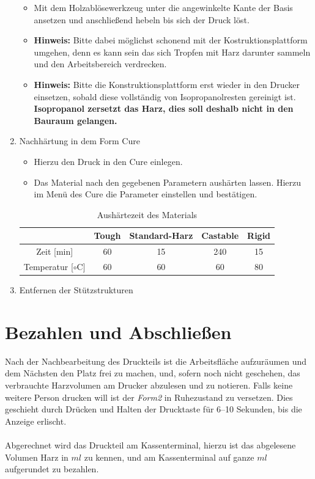\documentclass{\basedir/fablab-document}
\begin{document}
\begin{enumerate}
\begin{itemize}
            \item Mit dem Holzablösewerkzeug unter die angewinkelte Kante der Basis ansetzen und anschließend hebeln bis sich der Druck löst.
            \item \textbf{Hinweis:} Bitte dabei möglichst schonend mit der Kostruktionsplattform umgehen, denn es kann sein das sich Tropfen mit Harz darunter sammeln und den Arbeitsbereich verdrecken.
            \item \textbf{Hinweis:} Bitte die Konstruktionsplattform erst wieder in den Drucker einsetzen, sobald diese vollständig von Isopropanolresten gereinigt ist. \textbf{Isopropanol zersetzt das Harz, dies soll deshalb nicht in den Bauraum gelangen.}
        \end{itemize}
    \item Nachhärtung in dem Form Cure
        \begin{itemize}
            \item Hierzu den Druck in den Cure einlegen.
            \item Das Material nach den gegebenen Parametern aushärten lassen. Hierzu im Menü des Cure die Parameter einstellen und bestätigen.
        \end{itemize}
    
   \begin{table} [H]
   	\centering
   	\begin{tabular}{|c||c|c|c|c|}\hline
   		& Tough & Standard-Harz & Castable & Rigid\\ \hline\hline
   		Zeit [min]& 60 & 15 & 240 & 15\\ \hline
   		Temperatur [$\circ$C]& 60 & 60 & 60 & 80 \\ \hline
   	\end{tabular}
   	\caption{Aushärtezeit des Materials}
   	\label{table:AusEigenschaften}
   \end{table}

    \item Entfernen der Stützstrukturen

\end{enumerate}


\section{Bezahlen und Abschließen}

Nach der Nachbearbeitung des Druckteils ist die Arbeitsfläche aufzuräumen und dem Nächsten den Platz frei zu machen, und, sofern noch nicht geschehen, das verbrauchte Harzvolumen am Drucker abzulesen und zu notieren. Falls keine weitere Person drucken will ist der \textit{Form2} in Ruhezustand zu versetzen. Dies geschieht durch Drücken und Halten der Drucktaste für 6--10 Sekunden, bis die Anzeige erlischt. \\
\\
Abgerechnet wird das Druckteil am Kassenterminal, hierzu ist das abgelesene Volumen Harz in $ml$ zu kennen, und am Kassenterminal auf ganze $ml$ aufgerundet zu bezahlen.
\pagebreak
\end{document}
